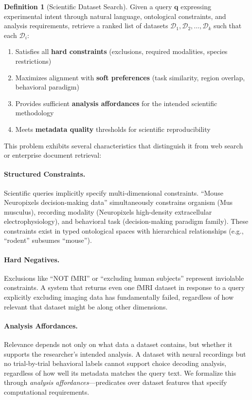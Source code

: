 \documentclass{article}
\theoremstyle{definition}
\newtheorem{definition}{Definition}[section]
\newcommand{\dataset}{\mathcal{D}}
\newcommand{\query}{\mathbf{q}}
\begin{document}
\begin{definition}[Scientific Dataset Search]
\label{def:dataset-search}
Given a query $\query$ expressing experimental intent through natural language, ontological constraints, and analysis requirements, retrieve a ranked list of datasets $\dataset_1, \dataset_2, \ldots, \dataset_k$ such that each $\dataset_i$:
\begin{enumerate}[label=(\roman*)]
    \item Satisfies all \textbf{hard constraints} (exclusions, required modalities, species restrictions)
    \item Maximizes alignment with \textbf{soft preferences} (task similarity, region overlap, behavioral paradigm)
    \item Provides sufficient \textbf{analysis affordances} for the intended scientific methodology
    \item Meets \textbf{metadata quality} thresholds for scientific reproducibility
\end{enumerate}
\end{definition}

This problem exhibits several characteristics that distinguish it from web search or enterprise document retrieval:

\paragraph{Structured Constraints.} Scientific queries implicitly specify multi-dimensional constraints. ``Mouse Neuropixels decision-making data'' simultaneously constrains organism (Mus musculus), recording modality (Neuropixels high-density extracellular electrophysiology), and behavioral task (decision-making paradigm family). These constraints exist in typed ontological spaces with hierarchical relationships (e.g., ``rodent'' subsumes ``mouse'').

\paragraph{Hard Negatives.} Exclusions like ``NOT fMRI'' or ``excluding human subjects'' represent inviolable constraints. A system that returns even one fMRI dataset in response to a query explicitly excluding imaging data has fundamentally failed, regardless of how relevant that dataset might be along other dimensions.

\paragraph{Analysis Affordances.} Relevance depends not only on what data a dataset contains, but whether it supports the researcher's intended analysis. A dataset with neural recordings but no trial-by-trial behavioral labels cannot support choice decoding analysis, regardless of how well its metadata matches the query text. We formalize this through \textit{analysis affordances}---predicates over dataset features that specify computational requirements.
\end{document}
